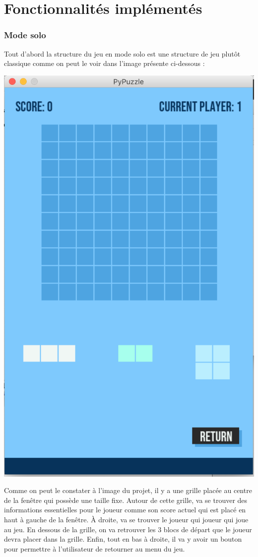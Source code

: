 \documentclass[]{report}
\begin{document}
\part{Fonctionnalités implémentés}
\section{Mode solo}
Tout d'abord la structure du jeu en mode solo est une structure de jeu plutôt classique comme on peut le voir dans l'image présente ci-dessous :\\
\begin{center}
\includegraphics[scale=0.2]{images/solo.png}\\
\end{center}
Comme on peut le constater à l'image du projet, il y a une grille placée au centre de la fenêtre qui possède une taille fixe. Autour de cette grille, va se trouver des informations essentielles pour le joueur comme son score actuel qui est placé en haut à gauche de la fenêtre. À droite, va se trouver le joueur qui joueur qui joue au jeu. En dessous de la grille, on va retrouver les 3 blocs de départ que le joueur devra placer dans la grille. Enfin, tout en bas à droite, il va y avoir un bouton pour permettre à l'utilisateur de retourner au menu du jeu. \\
\end{document}
